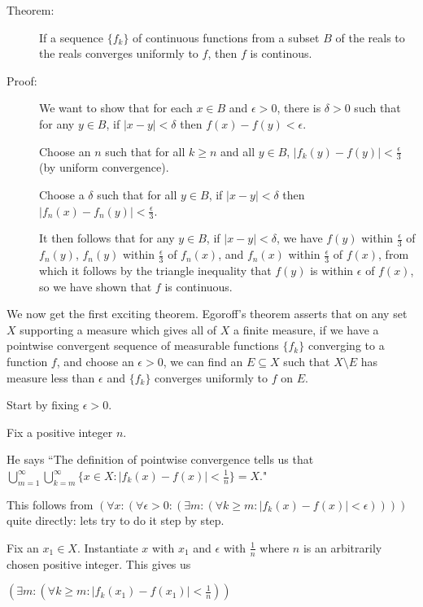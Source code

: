 \documentclass[12pt]{article}
\begin{document}
\begin{description}

\item[Theorem:]  If a sequence $\{f_k\}$ of continuous functions from a subset $B$ of the reals to the reals converges uniformly to $f$, then $f$ is continous.

\item[Proof:]  We want to show that for each $x \in B$ and $\epsilon>0$, there is $\delta>0$ such that for any $y \in B$,  if $|x-y|<\delta$ then $f(x)-f(y)<\epsilon$.

Choose an $n$ such that for all $k \geq n$ and all $y\in B$, $|f_k(y) - f(y)|<\frac\epsilon3$ (by uniform convergence).

Choose a $\delta$ such that for all $y\in B$, if $|x-y|<\delta$ then $|f_n(x)-f_n(y)|<\frac\epsilon3$.

It then follows that for any $y \in B$, if $|x-y|<\delta$, we have $f(y)$ within $ \frac\epsilon3$ of $f_n(y)$, $f_n(y)$ within $ \frac\epsilon3$ of $f_n(x)$, and 
$f_n(x)$ within $ \frac\epsilon3$ of $f(x)$, from which it follows by the triangle inequality that $f(y)$ is within $\epsilon$ of $f(x)$, so we have shown that $f$ is continuous.

\end{description}

We now get the first exciting theorem.  Egoroff's theorem asserts that on any set $X$ supporting a measure which gives all of $X$ a finite measure,
if we have a pointwise convergent sequence of measurable functions $\{f_k\}$ converging to a function $f$, and choose an $\epsilon>0$, we can find an $E \subseteq X$ such that $X \setminus E$ has measure less than $\epsilon$ and $\{f_k\}$ converges uniformly to $f$ on $E$.

Start by fixing $\epsilon >0$.

Fix a positive integer $n$.  

He says ``The definition of pointwise convergence tells us that $\bigcup_{m=1}^\infty \bigcup_{k=m}^\infty \{x \in X:|f_k(x)-f(x)|<\frac1n\} = X$."

This follows from $(\forall x:(\forall \epsilon>0:(\exists m:(\forall k \geq m:|f_k(x)-f(x)|<\epsilon))))$ quite directly:  lets try to do it step by step.

Fix an $x_1 \in X$.  Instantiate $x$ with $x_1$ and $\epsilon$ with $\frac1n$ where $n$ is an arbitrarily chosen positive integer.  This gives us

$(\exists m:(\forall k \geq m:|f_k(x_1)-f(x_1)|<\frac1n))$
\end{document}
